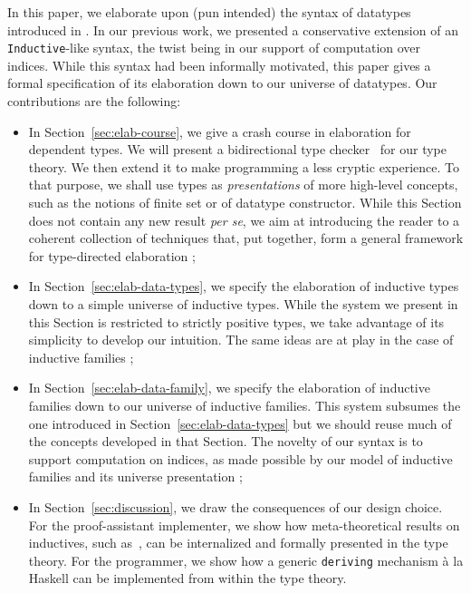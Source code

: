\documentclass{scrartcl}
\theoremstyle{plain}
\theoremstyle{definition}
\begin{document}
In this paper, we elaborate upon (pun intended) the syntax of
datatypes introduced in \citet{dagand:fun-orn}. In our previous work,
we presented a conservative extension of an \texttt{Inductive}-like
syntax, the twist being in our support of computation over
indices. While this syntax had been informally motivated, this paper
gives a formal specification of its elaboration down to our universe
of datatypes. Our contributions are the following:

\begin{itemize}



\item In Section~\ref{sec:elab-course}, we give a crash course in
  elaboration for dependent types. We will present a bidirectional
  type checker~\citep{pierce:bidirectional-tc} for our type theory. We
  then extend it to make programming a less cryptic experience. To
  that purpose, we shall use types as \emph{presentations} of more
  high-level concepts, such as the notions of finite set or of
  datatype constructor. While this Section does not contain any new
  result \emph{per se}, we aim at introducing the reader to a coherent
  collection of techniques that, put together, form a general
  framework for type-directed elaboration ;



\item In Section~\ref{sec:elab-data-types}, we specify the elaboration
  of inductive types down to a simple universe of inductive
  types. While the system we present in this Section is restricted to
  strictly positive types, we take advantage of its simplicity to
  develop our intuition. The same ideas are at play in the case of
  inductive families ;
  



\item In Section~\ref{sec:elab-data-family}, we specify the
  elaboration of inductive families down to our universe of inductive
  families. This system subsumes the one introduced in
  Section~\ref{sec:elab-data-types} but we should reuse much of the
  concepts developed in that Section. The novelty of our syntax is to
  support computation on indices, as made possible by our model of
  inductive families and its universe presentation ;




\item In Section~\ref{sec:discussion}, we draw the consequences of our
  design choice. For the proof-assistant implementer, we show how
  meta-theoretical results on inductives, such
  as~\citet{mcbride:construction-constructor}, can be internalized and
  formally presented in the type theory. For the programmer, we show
  how a generic \texttt{deriving} mechanism \`{a} la Haskell
  can be implemented from within the type theory.

\end{itemize}
\end{document}
